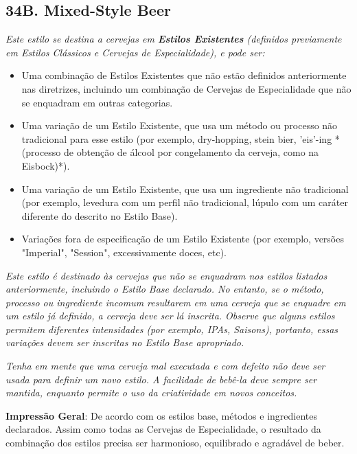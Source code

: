 \subsection*{34B. Mixed-Style Beer}

\textit{Este estilo se destina a cervejas em \textbf{Estilos Existentes} (definidos previamente em Estilos Clássicos e Cervejas de Especialidade), e pode ser:}

\begin{itemize}
  \item Uma combinação de Estilos Existentes que não estão definidos anteriormente nas diretrizes, incluindo um combinação de Cervejas de Especialidade que não se enquadram em outras categorias.
  \item Uma variação de um Estilo Existente, que usa um método ou processo não tradicional para esse estilo (por exemplo, dry-hopping, stein bier, 'eis'-ing *(processo de obtenção de álcool por congelamento da cerveja, como na Eisbock)*).
  \item Uma variação de um Estilo Existente, que usa um ingrediente não tradicional (por exemplo, levedura com um perfil não tradicional, lúpulo com um caráter diferente do descrito no Estilo Base).
  \item Variações fora de especificação de um Estilo Existente (por exemplo, versões "Imperial", "Session", excessivamente doces, etc).
\end{itemize}

\textit{Este estilo é destinado às cervejas que não se enquadram nos estilos listados anteriormente, incluindo o Estilo Base declarado. No entanto, se o método, processo ou ingrediente incomum resultarem em uma cerveja que se enquadre em um estilo já definido, a cerveja deve ser lá inscrita. Observe que alguns estilos permitem diferentes intensidades (por exemplo, IPAs, Saisons), portanto, essas variações devem ser inscritas no Estilo Base apropriado.}

\textit{Tenha em mente que uma cerveja mal executada e com defeito não deve ser usada para definir um novo estilo. A facilidade de bebê-la deve sempre ser mantida, enquanto permite o uso da criatividade em novos conceitos.}

\textbf{Impressão Geral}: De acordo com os estilos base, métodos e ingredientes declarados. Assim como todas as Cervejas de Especialidade, o resultado da combinação dos estilos precisa ser harmonioso, equilibrado e agradável de beber.

